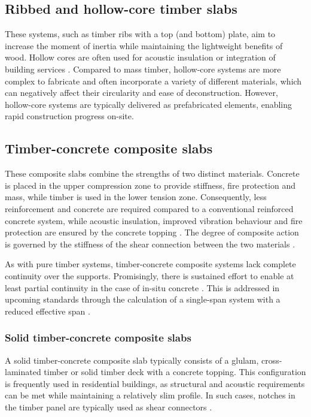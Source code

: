 \subsection{Ribbed and hollow-core timber slabs}
These systems, such as timber ribs with a top (and bottom) plate, aim to increase the moment of inertia while maintaining the lightweight benefits of wood. Hollow cores are often used for acoustic insulation or integration of building services \cite{Frangi2009_HC}. Compared to mass timber, hollow-core systems are more complex to fabricate and often incorporate a variety of different materials, which can negatively affect their circularity and ease of deconstruction. However, hollow-core systems are typically delivered as prefabricated elements, enabling rapid construction progress on-site.

\newpage
\subsection{Timber-concrete composite slabs}
These composite slabs combine the strengths of two distinct materials. Concrete is placed in the upper compression zone to provide stiffness, fire protection and mass, while timber is used in the lower tension zone. Consequently, less reinforcement and concrete are required compared to a conventional reinforced concrete system, while acoustic insulation, improved vibration behaviour and fire protection are ensured by the concrete topping \cite{proHolz2012_Zuschnitt45}. The degree of composite action is governed by the stiffness of the shear connection between the two materials \cite{Eurocode5_2023}.

As with pure timber systems, timber-concrete composite systems lack complete continuity over the supports. Promisingly, there is sustained effort to enable at least partial continuity in the case of in-situ concrete \cite{durchlauf_HBV}. This is addressed in upcoming standards through the calculation of a single-span system with a reduced effective span \cite{Eurocode5_2023}.

\subsubsection{Solid timber-concrete composite slabs}
A solid timber-concrete composite slab typically consists of a glulam, cross-laminated timber or solid timber deck with a concrete topping. This configuration is frequently used in residential buildings, as structural and acoustic requirements can be met while maintaining a relatively slim profile. In such cases, notches in the timber panel are typically used as shear connectors \cite{proHolz2012_Zuschnitt45, Eurocode5_2023}.

